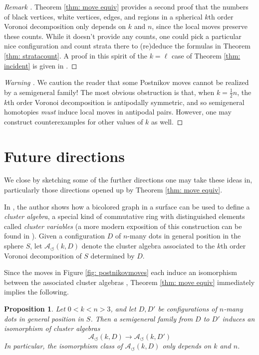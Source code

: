 \documentclass[11pt,oneside]{amsart}
\newtheorem{prop}[thm]{Proposition}
\theoremstyle{definition}
\theoremstyle{remark}
\newenvironment{rem}{\refstepcounter{thm}\begin{proof}[Remark \emph{\thethm}]\renewcommand*{\qedsymbol}{\(\blacksquare\)}}{\end{proof}}
\newenvironment{warn}{\refstepcounter{thm}\begin{proof}[Warning \emph{\thethm}]\renewcommand*{\qedsymbol}{\(\blacksquare\)}}{\end{proof}}
\numberwithin{equation}{section}
\begin{document}
\begin{rem}
Theorem \ref{thm: move equiv} provides a second proof that the numbers of black vertices, white vertices, edges, and regions in a spherical $k$th order Voronoi decomposition only depends on $k$ and $n$, since the local moves preserve these counts. While it doesn't provide any counts, one could pick a particular nice configuration and count strata there to (re)deduce the formulas in Theorem \ref{thm: stratacount}. A proof in this spirit of the $k=\ell$ case of  Theorem \ref{thm: incident} is given in \cite{Ard04}.
\end{rem}

\begin{warn}
We caution the reader that some Postnikov moves cannot be realized by a semigeneral family! The most obvious obstruction is that, when $k=\frac{1}{2}n$, the $k$th order Voronoi decomposition is antipodally symmetric, and so semigeneral homotopies \emph{must} induce local moves in antipodal pairs. However, one may construct counterexamples for other values of $k$ as well.
\end{warn}

\section{Future directions}\label{sec: future}

We close by sketching some of the further directions one may take these ideas in, particularly those directions opened up by Theorem \ref{thm: move equiv}.

In \cite{Pos}, the author shows how a bicolored graph in a surface can be used to define a \emph{cluster algebra}, a special kind of commutative ring with distinguished elements called \emph{cluster variables} (a more modern exposition of this construction can be found in \cite{FWZdd}).
Given a configuration $D$ of $n$-many dots in general position in the sphere $S$, 
let $\mathcal{A}_\circlearrowleft(k,D)$ denote the cluster algebra associated to the $k$th order Voronoi decomposition of $S$ determined by $D$.

Since the moves in Figure \ref{fig: postnikovmoves} each induce an isomorphism between the associated cluster algebras \cite[Proposition 7.2.2]{FWZdd}, Theorem \ref{thm: move equiv} immediately implies the following.

\begin{prop}
Let $0<k<n>3$, and let $D, D'$ be configurations of $n$-many dots in general position in $S$.
Then a semigeneral family from $D$ to $D'$ induces an isomorphism of cluster algebras
\[
\mathcal{A}_\circlearrowleft(k,D) \rightarrow \mathcal{A}_\circlearrowleft(k,D')
\]
In particular, the isomorphism class of $\mathcal{A}_\circlearrowleft(k,D)$ only depends on $k$ and $n$.
\end{prop}
\end{document}
